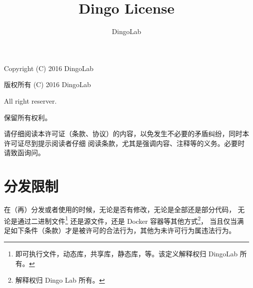 








\makeatletter
\def\@NoStyleChaper{\relax} %
\def\@NoLiterateHaskell{\relax} %
\def\@LicenseDoc{\relax} %
\def\@DocType{article}
\def\@DocTypeCTEX{ctexart}
\makeatother


\title{\Huge Dingo License}
\author{DingoLab}


  \maketitle

  {\huge Copyright (C) 2016 DingoLab}
  \par
  {\huge 版权所有 (C) 2016 DingoLab}
  \vspace*{3em}
  \par
  {\huge All right reserver.}
  \par
  {\huge 保留所有权利。}
  \par
  \vspace*{3em}
  {\huge 请仔细阅读本许可证（条款、协议）的内容，以免发生不必要的矛盾纠纷，同时本许可证尽到提示阅读者仔细
  阅读条款，尤其是强调内容、注释等的义务。必要时请致函询问。}
  \newpage
  \tableofcontents
  \newpage
  
  \section{分发限制}
  在（再）分发或者使用的时候，无论是否有修改，无论是全部还是部分代码，
  无论是通过二进制文件\footnote{即可执行文件，动态库，共享库，静态库，等。该定义解释权归 DingoLab 所有。}
  还是源文件，还是 Docker 容器等其他方式\footnote{解释权归 Dingo Lab 所有。}，
  当且仅当满足如下条件（条款）才是被许可的合法行为，其他为未许可行为属违法行为。

